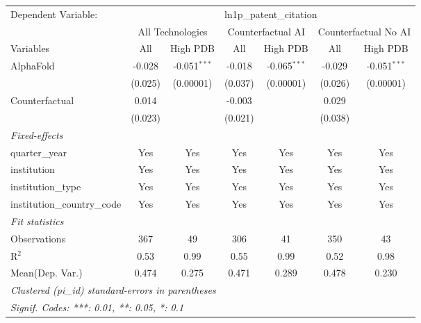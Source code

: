 \begingroup
\centering
\begin{tabular}{lcccccc}
   \tabularnewline \midrule \midrule
   Dependent Variable: & \multicolumn{6}{c}{ln1p\_patent\_citation}\\
 & \multicolumn{2}{c}{All Technologies} & \multicolumn{2}{c}{Counterfactual AI} & \multicolumn{2}{c}{Counterfactual No AI} \\
\cmidrule(lr){1-1}\cmidrule(lr){2-3} \cmidrule(lr){4-5} \cmidrule(lr){6-7}
Variables & \multicolumn{1}{c}{All} & \multicolumn{1}{c}{High PDB} & \multicolumn{1}{c}{All} & \multicolumn{1}{c}{High PDB} & \multicolumn{1}{c}{All} & \multicolumn{1}{c}{High PDB} \\
\cmidrule(lr){1-1}\cmidrule(lr){2-2} \cmidrule(lr){3-3} \cmidrule(lr){4-4} \cmidrule(lr){5-5} \cmidrule(lr){6-6} \cmidrule(lr){7-7}
   AlphaFold                    & -0.028  & -0.051$^{***}$ & -0.018  & -0.065$^{***}$ & -0.029  & -0.051$^{***}$\\   
                                & (0.025) & (0.00001)      & (0.037) & (0.00001)      & (0.026) & (0.00001)\\   
   Counterfactual               & 0.014   &                & -0.003  &                & 0.029   &   \\   
                                & (0.023) &                & (0.021) &                & (0.038) &   \\   
   \midrule
   \emph{Fixed-effects}\\
   quarter\_year                & Yes     & Yes            & Yes     & Yes            & Yes     & Yes\\  
   institution                  & Yes     & Yes            & Yes     & Yes            & Yes     & Yes\\  
   institution\_type            & Yes     & Yes            & Yes     & Yes            & Yes     & Yes\\  
   institution\_country\_code   & Yes     & Yes            & Yes     & Yes            & Yes     & Yes\\  
   \midrule
   \emph{Fit statistics}\\
   Observations                 & 367     & 49             & 306     & 41             & 350     & 43\\  
   R$^2$                        & 0.53    & 0.99           & 0.55    & 0.99           & 0.52    & 0.98\\  
Mean(Dep. Var.) & 0.474 & 0.275 & 0.471 & 0.289 & 0.478 & 0.230 \\
   \midrule \midrule
   \multicolumn{7}{l}{\emph{Clustered (pi\_id) standard-errors in parentheses}}\\
   \multicolumn{7}{l}{\emph{Signif. Codes: ***: 0.01, **: 0.05, *: 0.1}}\\
\end{tabular}
\par\endgroup
